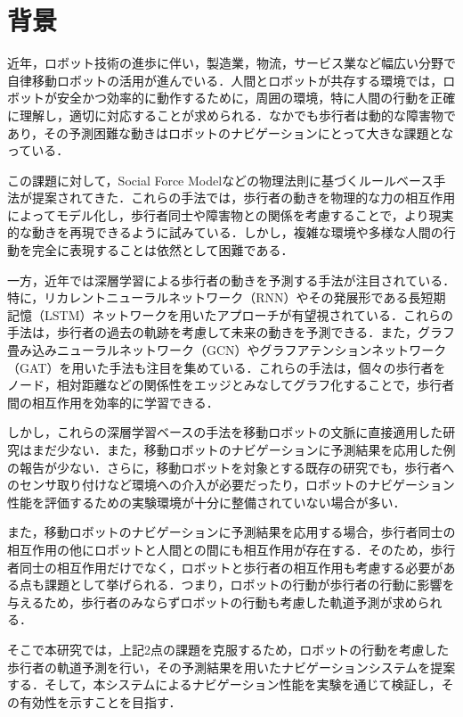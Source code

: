 
\section{背景}
近年，ロボット技術の進歩に伴い，製造業，物流，サービス業など幅広い分野で自律移動ロボットの活用が進んでいる．人間とロボットが共存する環境では，ロボットが安全かつ効率的に動作するために，周囲の環境，特に人間の行動を正確に理解し，適切に対応することが求められる．なかでも歩行者は動的な障害物であり，その予測困難な動きはロボットのナビゲーションにとって大きな課題となっている．

この課題に対して，Social Force Model\cite{s-lstm}などの物理法則に基づくルールベース手法が提案されてきた．これらの手法では，歩行者の動きを物理的な力の相互作用によってモデル化し，歩行者同士や障害物との関係を考慮することで，より現実的な動きを再現できるように試みている．しかし，複雑な環境や多様な人間の行動を完全に表現することは依然として困難である．

一方，近年では深層学習による歩行者の動きを予測する手法が注目されている．特に，リカレントニューラルネットワーク（RNN）\cite{rumelhart1986learning1,rumelhart1986learning2}やその発展形である長短期記憶（LSTM）\cite{hochreiter1997long}ネットワークを用いたアプローチが有望視されている．これらの手法は，歩行者の過去の軌跡を考慮して未来の動きを予測できる．また，グラフ畳み込みニューラルネットワーク（GCN）\cite{kipf2016semi-gcn}やグラフアテンションネットワーク（GAT）\cite{velickovic2017graph-gat}を用いた手法も注目を集めている．これらの手法は，個々の歩行者をノード，相対距離などの関係性をエッジとみなしてグラフ化することで，歩行者間の相互作用を効率的に学習できる．

しかし，これらの深層学習ベースの手法を移動ロボットの文脈に直接適用した研究はまだ少ない．また，移動ロボットのナビゲーションに予測結果を応用した例の報告が少ない．さらに，移動ロボットを対象とする既存の研究でも，歩行者へのセンサ取り付けなど環境への介入が必要だったり，ロボットのナビゲーション性能を評価するための実験環境が十分に整備されていない場合が多い．

また，移動ロボットのナビゲーションに予測結果を応用する場合，歩行者同士の相互作用の他にロボットと人間との間にも相互作用が存在する．そのため，歩行者同士の相互作用だけでなく，ロボットと歩行者の相互作用も考慮する必要がある点も課題として挙げられる．つまり，ロボットの行動が歩行者の行動に影響を与えるため，歩行者のみならずロボットの行動も考慮した軌道予測が求められる．

そこで本研究では，上記2点の課題を克服するため，ロボットの行動を考慮した歩行者の軌道予測を行い，その予測結果を用いたナビゲーションシステムを提案する．そして，本システムによるナビゲーション性能を実験を通じて検証し，その有効性を示すことを目指す．

\newpage
